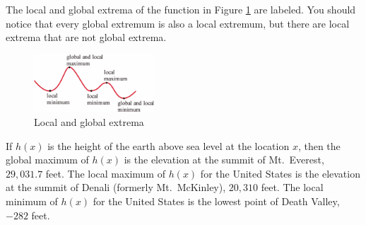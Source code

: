 The local and global extrema of the function in Figure \ref{fig:3-4-extrema} are labeled. You should notice that every global extremum is also a local extremum, but there are local extrema that are not global extrema.

\begin{figure}[!ht]
  \centering
    \includegraphics[width=0.4\textwidth]{img/chap3/image056.png}
    \caption{Local and global extrema}
    \label{fig:3-4-extrema}
\end{figure}

If $h(x)$ is the height of the earth above sea level at the location $x$, then the global maximum of $h(x)$ is the elevation at the summit of Mt.\ Everest, $29{,}031.7$ feet. The local maximum of $h(x)$ for the United States is the elevation at the summit of Denali (formerly Mt.\ McKinley), $20{,}310$ feet. The local minimum of $h(x)$ for the United States is the lowest point of Death Valley, $-282$ feet.

